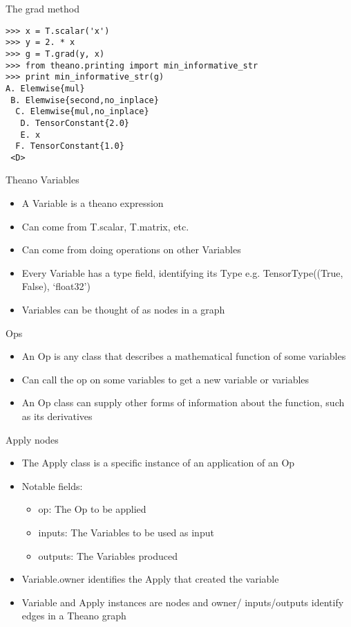 \documentclass[utf8x]{beamer}
\begin{document}
\begin{frame}[fragile]{The grad method}

\begin{lstlisting}
>>> x = T.scalar('x')
>>> y = 2. * x
>>> g = T.grad(y, x)
>>> from theano.printing import min_informative_str
>>> print min_informative_str(g)
A. Elemwise{mul}
 B. Elemwise{second,no_inplace}
  C. Elemwise{mul,no_inplace}
   D. TensorConstant{2.0}
   E. x
  F. TensorConstant{1.0}
 <D>
\end{lstlisting}
\end{frame}

\begin{frame}{Theano Variables}
  \begin{itemize}
  \item A Variable is a theano expression
  \item Can come from T.scalar, T.matrix, etc.
  \item Can come from doing operations on other Variables
  \item Every Variable has a type field, identifying its Type \newline
    e.g. TensorType((True, False), ‘float32’)
  \item Variables can be thought of as nodes in a graph
  \end{itemize}
\end{frame}

\begin{frame}{Ops}
  \begin{itemize}
  \item  An Op is any class that describes a
mathematical function of some variables
  \item Can call the op on some variables to get a
new variable or variables
  \item An Op class can supply other forms of
information about the function, such as its
derivatives
  \end{itemize}
\end{frame}

\begin{frame}{Apply nodes}
  \begin{itemize}
  \item The Apply class is a specific instance of an application of an Op
  \item Notable fields:
    \begin{itemize}
    \item op: The Op to be applied
    \item inputs: The Variables to be used as input
    \item outputs: The Variables produced
    \end{itemize}
  \item Variable.owner identifies the Apply that created the variable
  \item Variable and Apply instances are nodes and owner/
    inputs/outputs identify edges in a Theano graph
  \end{itemize}
\end{frame}
\end{document}
